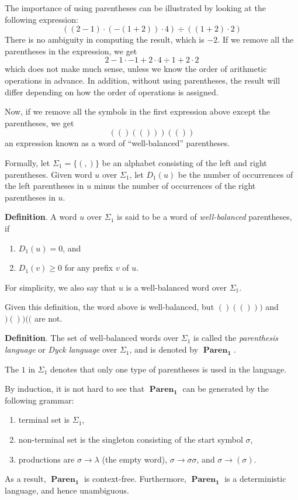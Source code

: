 \documentclass[12pt]{article}
\begin{document}
The importance of using parentheses can be illustrated by looking at the following expression:
$$((2-1)\cdot (-(1+2))\cdot 4)\div((1+2)\cdot 2)$$
There is no ambiguity in computing the result, which is $-2$.  If we remove all the parentheses in the expression, we get 
$$2-1\cdot -1+2 \cdot 4\div 1+2 \cdot 2$$
which does not make much sense, unless we know the order of arithmetic operations in advance.  In addition, without using parentheses, the result will differ depending on how the order of operations is assigned.

Now, if we remove all the symbols in the first expression above except the parentheses, we get 
$$(()(()))(())$$
an expression known as a word of ``well-balanced'' parentheses.

Formally, let $\Sigma_1 = \lbrace (, ) \rbrace$ be an alphabet consisting of the left and right parentheses.  Given word $u$ over $\Sigma_1$, let $D_1(u)$ be the number of occurrences of the left parentheses in $u$ minus the number of occurrences of the right parentheses in $u$.  

\textbf{Definition}.  A word $u$ over $\Sigma_1$ is said to be a word of \emph{well-balanced} parentheses, if 
\begin{enumerate}
\item $D_1(u)=0$, and
\item $D_1(v)\ge 0$ for any prefix $v$ of $u$.
\end{enumerate}
For simplicity, we also say that $u$ is a well-balanced word over $\Sigma_1$.

Given this definition, the word above is well-balanced, but $()(()))$ and $)())(($ are not.

\textbf{Definition}.  The set of well-balanced words over $\Sigma_1$ is called the \emph{parenthesis language} or \emph{Dyck language} over $\Sigma_1$, and is denoted by $\boldsymbol{\operatorname{Paren}_1}$.  

The $1$ in $\Sigma_1$ denotes that only one type of parentheses is used in the language.  

By induction, it is not hard to see that $\boldsymbol{\operatorname{Paren}_1}$ can be generated by the following grammar:
\begin{enumerate}
\item terminal set is $\Sigma_1$, 
\item non-terminal set is the singleton consisting of the start symbol $\sigma$, 
\item productions are $\sigma \to \lambda$ (the empty word), $\sigma \to \sigma\sigma$, and $\sigma \to ( \sigma )$.  
\end{enumerate}
As a result, $\boldsymbol{\operatorname{Paren}_1}$ is context-free.  Furthermore, $\boldsymbol{\operatorname{Paren}_1}$ is a deterministic language, and hence unambiguous.
\end{document}
